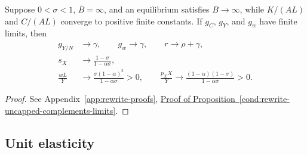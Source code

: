 \begin{proposition}
\label{cond:rewrite-uncapped-complements-limits}
Suppose $0<\sigma<1$, $\overline B=\infty$, and an equilibrium satisfies
$B\to\infty$, while $K/(AL)$ and $C/(AL)$ converge to positive finite
constants. If $g_C$, $g_Y$, and $g_w$ have finite limits, then
\begin{align}
 g_{Y/N}&\to\gamma,\qquad g_w\to\gamma,\qquad r\to\rho+\gamma,
 \label{eq:rewrite-uncapped-complements-rates}\\
 s_X&\to\frac{1-\sigma}{1-\alpha\sigma},
 \label{eq:rewrite-uncapped-complements-sx}\\
 \frac{wL}{Y}&\to\frac{\sigma(1-\alpha)^2}{1-\alpha\sigma}>0,
 \qquad
 \frac{p_XX}{Y}\to\frac{(1-\alpha)(1-\sigma)}{1-\alpha\sigma}>0.
 \label{eq:rewrite-uncapped-complements-income}
\end{align}
\end{proposition}
\begin{proof}
See Appendix~\ref{app:rewrite-proofs},
\hyperref[proof:rewrite-uncapped-complements-limits]{Proof of
Proposition~\ref*{cond:rewrite-uncapped-complements-limits}}.
\end{proof}



\subsection{Unit elasticity}
\label{subsec:rewrite-uncapped-unit-bgp}

